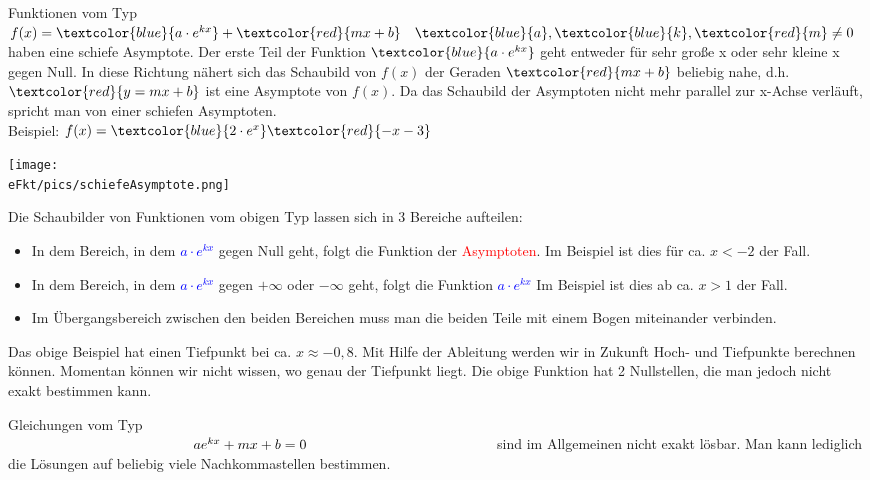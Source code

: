 Funktionen vom Typ \(f(x)=\textcolor{blue}{a\cdot e^{kx}}+\textcolor{red}{mx+b}\quad \textcolor{blue}{a},\textcolor{blue}{k}, \textcolor{red}{m}\neq 0\) haben eine schiefe Asymptote. Der erste Teil der Funktion \(\textcolor{blue}{a\cdot e^{kx}}\) geht entweder für sehr große x oder sehr kleine x gegen Null. In diese Richtung nähert sich das Schaubild von \(f(x)\) der Geraden \(\textcolor{red}{mx+b}\) beliebig nahe, d.h. \(\textcolor{red}{y=mx+b}\) ist eine Asymptote von \(f(x)\). Da das Schaubild der Asymptoten nicht mehr parallel zur x-Achse verläuft, spricht man von einer schiefen Asymptoten.\\
Beispiel: \(f(x)=\textcolor{blue}{2\cdot e^{x}}\textcolor{red}{-x-3}\)\\
\begin{minipage}{\linewidth}
	\centering
	\texttt{[image: \\eFkt/pics/schiefeAsymptote.png]}
\end{minipage}
Die Schaubilder von Funktionen vom obigen Typ lassen sich in 3 Bereiche aufteilen:
\begin{itemize}
	\item In dem Bereich, in dem \textcolor{blue}{\(a\cdot e^{kx}\)} gegen Null geht, folgt die Funktion der \textcolor{red}{Asymptoten}. Im Beispiel ist dies für ca. \(x<-2\) der Fall.
	\item In dem Bereich, in dem \textcolor{blue}{\(a\cdot e^{kx}\)} gegen \(+\infty\) oder \(-\infty\) geht, folgt die Funktion \textcolor{blue}{\(a\cdot e^{kx}\)} Im Beispiel ist dies ab ca. \(x>1\) der Fall.
	\item Im Übergangsbereich zwischen den beiden Bereichen muss man die beiden Teile mit einem Bogen miteinander verbinden.
\end{itemize}
Das obige Beispiel hat einen Tiefpunkt bei ca. \(x\approx -0,8\). Mit Hilfe der Ableitung werden wir in Zukunft Hoch- und Tiefpunkte berechnen können. Momentan können wir nicht wissen, wo genau der Tiefpunkt liegt. Die obige Funktion hat 2 Nullstellen, die man jedoch nicht exakt bestimmen kann.
\begin{tcolorbox}
	Gleichungen vom Typ\\
	$\makebox[\linewidth]{\(ae^{kx}+mx+b=0\)}$
	sind im Allgemeinen nicht exakt lösbar. Man kann lediglich die Lösungen auf beliebig viele Nachkommastellen bestimmen.
\end{tcolorbox}
\newpage

